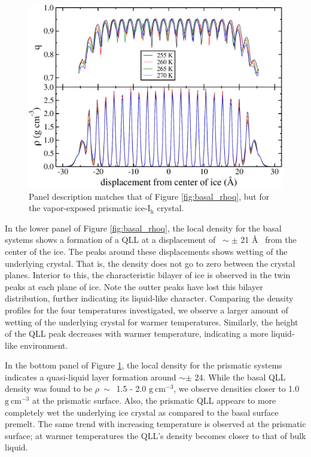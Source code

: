 \begin{figure}
\includegraphics[width=\linewidth]{Figures/prism_rhoq}
\caption{\label{fig:prism_rhoq} Panel description matches that of
  Figure \ref{fig:basal_rhoq}, but for the vapor-exposed prismatic
  ice-I$_\mathrm{h}$ crystal. }
\end{figure}                

In the lower panel of Figure \ref{fig:basal_rhoq}, the local density
for the basal systems shows a formation of a QLL at a displacement of
$~\sim\pm$ 21 \AA~ from the center of the ice. The peaks around these
displacements shows wetting of the underlying crystal. That is, the
density does not go to zero between the crystal planes. Interior to
this, the characteristic bilayer of ice is observed in the twin peaks
at each plane of ice. Note the outter peaks have lost this bilayer
distribution, further indicating its liquid-like character. Comparing
the density profiles for the four temperatures investigated, we
observe a larger amount of wetting of the underlying crystal for
warmer temperatures. Similarly, the height of the QLL peak decreases
with warmer temperature, indicating a more liquid-like environment.

In the bottom panel of Figure \ref{fig:prism_rhoq}, the
local density for the prismatic systems indicates a quasi-liquid layer
formation around $\sim\pm$ 24. While the basal QLL density was found
to be $\rho~ \sim$~1.5 - 2.0 $\mathrm{g}~\mathrm{cm}^{-3}$, we observe
densities closer to 1.0 $\mathrm{g}~\mathrm{cm}^{-3}$ at the prismatic
surface. Also, the prismatic QLL appears to more completely wet the underlying
ice crystal as compared to the basal surface premelt. The same
trend with increasing temperature is observed at the prismatic
surface; at warmer temperatures the QLL's density becomes closer to
that of bulk liquid. 

